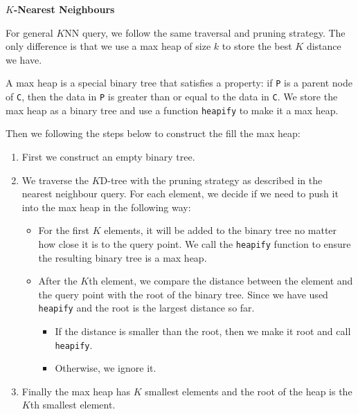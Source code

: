 \noindent
\textbf{$K$-Nearest Neighbours}

For general $K$NN query, we follow the same traversal and pruning strategy. The only difference is that we use a max heap of size $k$ to store the best $K$ distance we have.

A max heap is a special binary tree that satisfies a property: if \texttt{P} is a parent node of \texttt{C}, then the data in \texttt{P} is greater than or equal to the data in \texttt{C}. We store the max heap as a binary tree and use a function \texttt{heapify} to make it a max heap.

Then we following the steps below to construct the fill the max heap:

\begin{enumerate}
	\item First we construct an empty binary tree. 
	\item We traverse the $K$D-tree with the pruning strategy as described in the nearest neighbour query. For each element, we decide if we need to push it into the max heap in the following way:
	\begin{itemize}
		\item For the first $K$ elements, it will be added to the binary tree no matter how close it is to the query point. We call the \texttt{heapify} function to ensure the resulting binary tree is a max heap.
		\item After the $K$th element, we compare the distance between the element and the query point with the root of the binary tree. Since we have used \texttt{heapify} and the root is the largest distance so far.
		\begin{itemize}
			\item If the distance is smaller than the root, then we make it root and call \texttt{heapify}.
			\item Otherwise, we ignore it.
		\end{itemize}
	\end{itemize}
	\item Finally the max heap has $K$ smallest elements and the root of the heap is the $K$th smallest element.
\end{enumerate}
